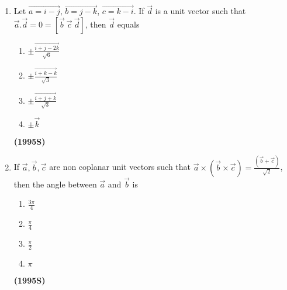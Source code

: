 \documentclass[journal,12pt,twocolumn]{IEEEtran}
\theoremstyle{remark}
\begin{document}
\begin{enumerate}
\item Let $\vec{a=i-j}$, $\vec{b=j-k}$, $\vec{c=k-i}$. If $\vec{d}$ is a unit vector such that $\vec{a}.\vec{d} = 0 = [\vec{b} \ \vec{c} \ \vec{d}]$, then $\vec{d}$ equals
\begin{enumerate}[label=(\alph*)]
\item $\pm \frac{\vec{i+j-2k}}{\sqrt{6}}$
\item $\pm \frac{\vec{i+k-k}}{\sqrt{3}}$
\item $\pm \frac{\vec{i+j+k}}{\sqrt{3}}$
\item $\pm \vec{k}$
\end{enumerate}
\hfill{\textbf{(1995S)}}

\item If $\vec{a},\vec{b},\vec{c}$ are non coplanar unit vectors such that $\vec{a}\times(\vec{b} \times \vec{c}) = \frac{(\vec{b}+\vec{c})}{\sqrt{2}}$, then the angle between $\vec{a}$ and $\vec{b}$ is
\begin{enumerate}[label = (\alph*)]
\item $\frac{3 \pi}{4}$
\item $\frac{\pi}{4}$
\item $\frac{\pi}{2}$
\item $\pi$
\end{enumerate}
\hfill{\textbf{(1995S)}}
\end{enumerate}
\end{document}
